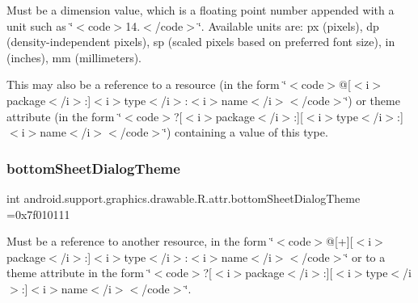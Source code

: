 Must be a dimension value, which is a floating point number appended with a unit such as \char`\"{}$<$code$>$14.\+5sp$<$/code$>$\char`\"{}. Available units are\+: px (pixels), dp (density-\/independent pixels), sp (scaled pixels based on preferred font size), in (inches), mm (millimeters). 

This may also be a reference to a resource (in the form \char`\"{}$<$code$>$@\mbox{[}$<$i$>$package$<$/i$>$\+:\mbox{]}$<$i$>$type$<$/i$>$\+:$<$i$>$name$<$/i$>$$<$/code$>$\char`\"{}) or theme attribute (in the form \char`\"{}$<$code$>$?\mbox{[}$<$i$>$package$<$/i$>$\+:\mbox{]}\mbox{[}$<$i$>$type$<$/i$>$\+:\mbox{]}$<$i$>$name$<$/i$>$$<$/code$>$\char`\"{}) containing a value of this type. \mbox{\label{classandroid_1_1support_1_1graphics_1_1drawable_1_1R_1_1attr_a097f7a526ff53652524f36b732d690e7}} 
\subsubsection{\texorpdfstring{bottom\+Sheet\+Dialog\+Theme}{bottomSheetDialogTheme}}
{\footnotesize\ttfamily int android.\+support.\+graphics.\+drawable.\+R.\+attr.\+bottom\+Sheet\+Dialog\+Theme =0x7f010111\hspace{0.3cm}{\ttfamily [static]}}

Must be a reference to another resource, in the form \char`\"{}$<$code$>$@\mbox{[}+\mbox{]}\mbox{[}$<$i$>$package$<$/i$>$\+:\mbox{]}$<$i$>$type$<$/i$>$\+:$<$i$>$name$<$/i$>$$<$/code$>$\char`\"{} or to a theme attribute in the form \char`\"{}$<$code$>$?\mbox{[}$<$i$>$package$<$/i$>$\+:\mbox{]}\mbox{[}$<$i$>$type$<$/i$>$\+:\mbox{]}$<$i$>$name$<$/i$>$$<$/code$>$\char`\"{}. \mbox{\label{classandroid_1_1support_1_1graphics_1_1drawable_1_1R_1_1attr_ab96dcf85d670800ab51b86708b68f24c}} 
